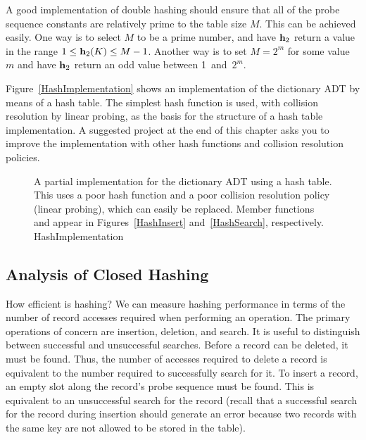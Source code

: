 \vspace{-\smallskipamount}
A good implementation of double hashing
should ensure that all of the probe sequence constants are relatively
prime to the table size \(M\).
This can be achieved easily.
One way is to select \(M\) to be a prime number, and have \({\bf h}_2\)
return a value in the range \(1 \leq {\bf h}_2(K) \leq M-1\).
Another way is to set \(M = 2^m\) for some value \(m\) and have
\({\bf h}_2\) return an odd
value
between 1~and~\(2^m\).

Figure~\ref{HashImplementation} shows an implementation of the
dictionary ADT by means of a hash table.
The simplest hash function is used, with collision resolution by
linear probing, as the basis for the structure of a hash table
implementation.
A suggested project at the end of this chapter asks you to improve
the implementation with other hash functions and collision resolution
policies.

\begin{figure}
\medskip
{}
{A partial implementation for the dictionary ADT using a hash table.
This uses a poor hash function and a poor collision resolution policy
(linear probing), which can easily be replaced.
Member functions  and  appear in
Figures~\ref{HashInsert} and~\ref{HashSearch}, respectively.}
{HashImplementation}
\end{figure}


\subsection{Analysis of Closed Hashing}

How efficient is hashing?
We can measure hashing performance in terms of the number of
record accesses required when performing an operation.
The primary operations of concern are insertion, deletion, and search.
It is useful to distinguish between successful and unsuccessful searches.
Before a record can be deleted, it must be found.
Thus, the number of accesses required to delete a record is
equivalent to the number required to successfully search for it.
To insert a record, an empty slot along the record's probe
sequence must be found.
This is equivalent to an
unsuccessful search for the record
(recall that a successful search for the record during insertion
should generate an error because two records with the same key are not
allowed to be stored in the table).

